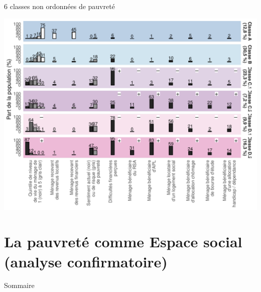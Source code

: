 \documentclass[10pt,xcolor=table,color={dvipsnames,usenames},ignorenonframetext,usepdftitle=false,french]{beamer}
\begin{document}
\begin{frame}{6 classes non ordonnées de pauvreté}
\protect\hypertarget{classes-non-ordonnuxe9es-de-pauvretuxe9}{}
\begin{center}\includegraphics[width=1\linewidth]{M2_ANTUNEZ_SQD_ORAL_files/figure-beamer/latentclass2-1} \end{center}
\end{frame}

\hypertarget{esconfi}{%
\section{La pauvreté comme Espace social (analyse
confirmatoire)}\label{esconfi}}

\begin{frame}{Sommaire}
\protect\hypertarget{sommaire-3}{}
\end{frame}
\end{document}
